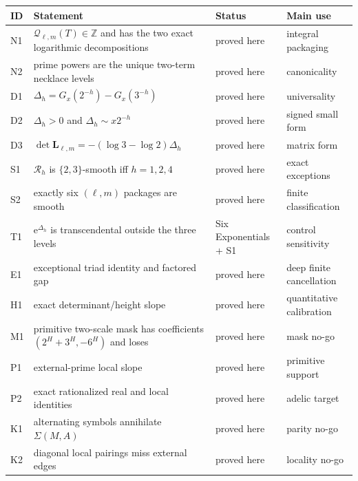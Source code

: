 \documentclass[11pt]{article}
\numberwithin{equation}{section}
\theoremstyle{definition}
\theoremstyle{remark}
\newcommand{\Z}{\mathbb Z}
\newcommand{\e}{\mathrm e}
\begin{document}
\begin{longtable}{p{}p{}p{}p{}}
\toprule
ID & Statement & Status & Main use\\
\midrule
\endhead
N1 & $\mathcal Q_{\ell,m}(T)\in\Z$ and has the two exact logarithmic decompositions & proved here & integral packaging\\
N2 & prime powers are the unique two-term necklace levels & proved here & canonicality\\
D1 & $\Delta_h=G_x(2^{-h})-G_x(3^{-h})$ & proved here & universality\\
D2 & $\Delta_h>0$ and $\Delta_h\sim x2^{-h}$ & proved here & signed small form\\
D3 & $\det\mathbf L_{\ell,m}=-(\log3-\log2)\Delta_h$ & proved here & matrix form\\
S1 & $\mathcal R_h$ is $\{2,3\}$-smooth iff $h=1,2,4$ & proved here & exact exceptions\\
S2 & exactly six $(\ell,m)$ packages are smooth & proved here & finite classification\\
T1 & $\e^{\Delta_h}$ is transcendental outside the three levels & Six Exponentials + S1 & control sensitivity\\
E1 & exceptional triad identity and factored gap & proved here & deep finite cancellation\\
H1 & exact determinant/height slope & proved here & quantitative calibration\\
M1 & primitive two-scale mask has coefficients $(2^H+3^H,-6^H)$ and loses & proved here & mask no-go\\
P1 & external-prime local slope & proved here & primitive support\\
P2 & exact rationalized real and local identities & proved here & adelic target\\
K1 & alternating symbols annihilate $\Sigma(M,A)$ & proved here & parity no-go\\
K2 & diagonal local pairings miss external edges & proved here & locality no-go\\
\bottomrule
\end{longtable}
\end{document}
